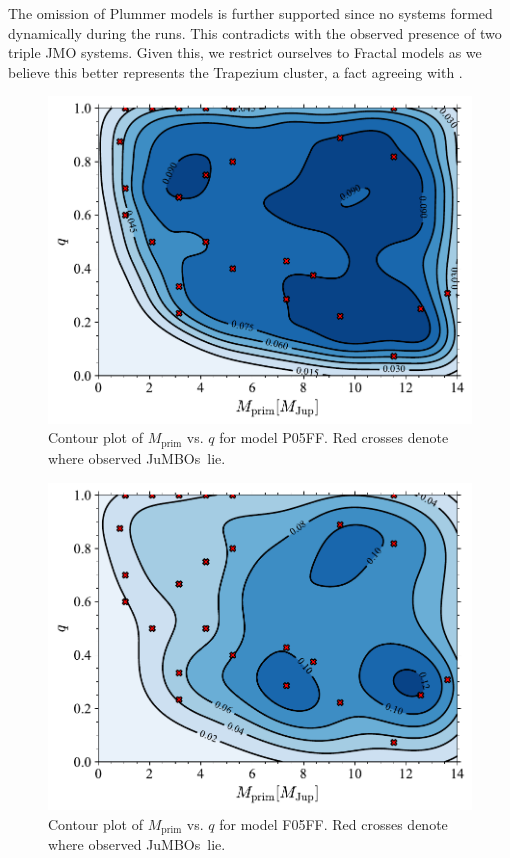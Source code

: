 \documentclass[submission,phys]{lib/SciPost}
\newcommand{\jumbos}{\mbox{JuMBOs}}
\begin{document}
    The omission of Plummer models is further supported since no systems formed dynamically during the runs. This contradicts with the observed presence of two triple JMO systems. Given this, we restrict ourselves to Fractal models as we believe this better represents the Trapezium cluster, a fact agreeing with \cite{2016MNRAS.457..313P}.
   
   \begin{figure}
    \centering
        \includegraphics[width=\columnwidth]{figures/Plummer_rvir0.5_FF_mass_distr.pdf}
        \caption{Contour plot of $M_{\mathrm{prim}}$ vs. $q$ for model P05FF. Red crosses denote where observed \jumbos\, lie.}
         \label{Fig:Gen_mdistr_Plummer}
   \end{figure}
   
   \begin{figure}
    \centering
        \includegraphics[width=\columnwidth]{figures/Fractal_rvir0.5_FF_mass_distr.pdf}
        \caption{Contour plot of $M_{\mathrm{prim}}$ vs. $q$ for model F05FF. Red crosses denote where observed \jumbos\, lie.}
         \label{Fig:Gen_mdistr_Fractal}
   \end{figure}
\end{document}
